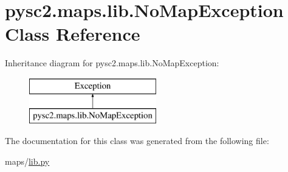 \hypertarget{classpysc2_1_1maps_1_1lib_1_1_no_map_exception}{}\section{pysc2.\+maps.\+lib.\+No\+Map\+Exception Class Reference}
\label{classpysc2_1_1maps_1_1lib_1_1_no_map_exception}
Inheritance diagram for pysc2.\+maps.\+lib.\+No\+Map\+Exception\+:\begin{figure}[H]
\begin{center}
\leavevmode
\includegraphics[height=2.000000cm]{classpysc2_1_1maps_1_1lib_1_1_no_map_exception}
\end{center}
\end{figure}


The documentation for this class was generated from the following file\+:\begin{DoxyCompactItemize}
\item 
maps/\mbox{\hyperlink{maps_2lib_8py}{lib.\+py}}\end{DoxyCompactItemize}
